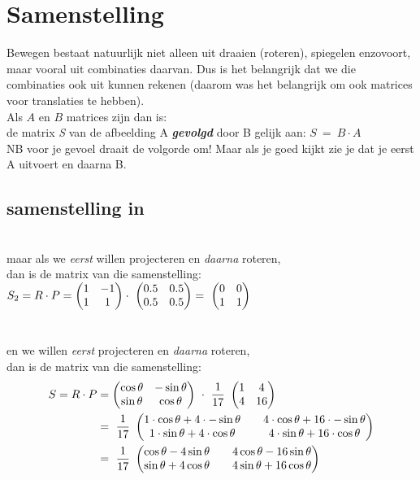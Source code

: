 \section{Samenstelling}		
Bewegen bestaat natuurlijk niet alleen uit draaien (roteren), spiegelen enzovoort, maar vooral uit combinaties daarvan. Dus is het belangrijk dat we die combinaties ook uit kunnen rekenen (daarom was het belangrijk om ook matrices voor translaties te hebben). \\ 
{Als $ A $ en $ B $  matrices zijn dan is:\\
	de matrix\textit{ S }van de afbeelding A \textit{\textbf{gevolgd}} door  B 	gelijk aan:
	\quad $ S\ = \ B \cdot A $ \\ NB voor je gevoel draait de volgorde om! Maar als je goed kijkt zie je dat je eerst A uitvoert en daarna B.}
\subsection{samenstelling in \RT}
 \\
maar als we \textit{eerst} willen  projecteren en \textit{daarna}  roteren, \\ dan is de matrix van die samenstelling:\\
$  S_2 = R\cdot P
= \begin{pmatrix}  1 & -1  \\  1 & 1  \end{pmatrix} \cdot 
\ \begin{pmatrix}  0.5 & 0.5  \\  0.5 & 0.5  \end{pmatrix} 
= \ \begin{pmatrix}  0 & 0  \\  1 & 1  \end{pmatrix}
$ \\ \\ \\
en we willen \textit{eerst} projecteren  en \textit{daarna} roteren, \\
dan is de matrix van die samenstelling: 
\begin{align*} 
S = R\cdot P 
&=	  \mattwee { \cos \theta & -\sin \theta }
{ \sin \theta & \cos \theta}  \ \cdot  \ 
\frac{1}{17} \  \mattwee { 1 & 4 }
{ 4  & 16 }  \\
& = \   \frac{1}{17} \  
\mattwee { 1\cdot \cos \theta + 4\cdot -\sin \theta  & & 4\cdot \cos \theta + 16\cdot -\sin \theta  }
{ 1\cdot \sin \theta + 4\cdot \cos \theta &  &4\cdot \sin \theta + 16\cdot \cos \theta}  \\  
& = \   \frac{1}{17} \  
\mattwee { \cos \theta - 4\sin \theta  & & 4\cos \theta - 16\sin \theta  }
{ \sin \theta + 4\cos \theta & & 4\sin \theta + 16\cos \theta}                                                
\end{align*} 

